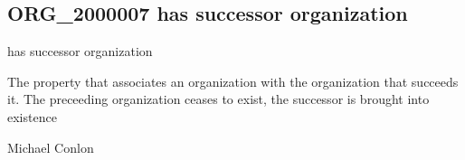\documentclass[letterpaper,10pt,english]{sphinxmanual}
\begin{document}
\subsection{ORG\_2000007 \sphinxhyphen{} has successor organization}
\label{\detokenize{doc-ORG_2000007:org-2000007-has-successor-organization}}\label{\detokenize{doc-ORG_2000007:index-0}}\label{\detokenize{doc-ORG_2000007::doc}}
\begin{sphinxShadowBox}

\sphinxAtStartPar
has successor organization
\end{sphinxShadowBox}

\begin{sphinxShadowBox}

\sphinxAtStartPar
{}
\end{sphinxShadowBox}

\begin{sphinxShadowBox}

\sphinxAtStartPar
The property that associates an organization with the organization that succeeds it.  The preceeding organization ceases to exist, the successor is brought into existence
\end{sphinxShadowBox}

\begin{sphinxShadowBox}

\sphinxAtStartPar
Michael Conlon 
\end{sphinxShadowBox}

\begin{sphinxShadowBox}

\sphinxAtStartPar
{\hyperref[\detokenize{doc-ORG_0000001::doc}]{}}
\end{sphinxShadowBox}

\begin{sphinxShadowBox}

\sphinxAtStartPar
{\hyperref[\detokenize{doc-ORG_0000001::doc}]{}}
\end{sphinxShadowBox}

\begin{sphinxShadowBox}

\sphinxAtStartPar
{\hyperref[\detokenize{doc-ORG_2000008::doc}]{}}
\end{sphinxShadowBox}
\end{document}
